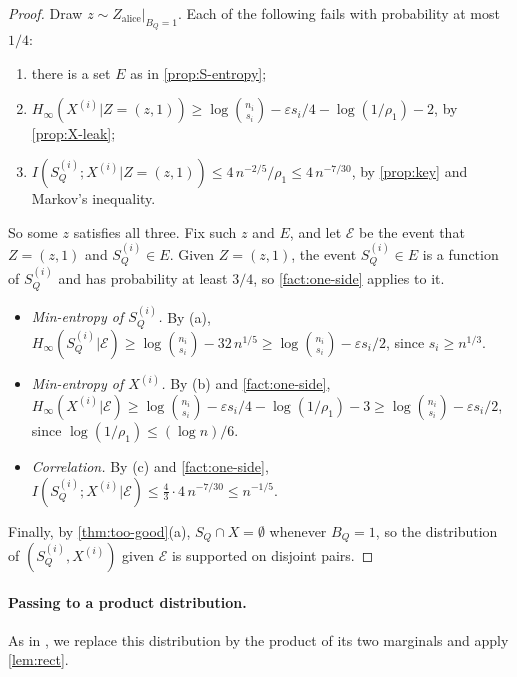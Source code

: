 \documentclass[11pt]{article}
\theoremstyle{plain}
\theoremstyle{definition}
\theoremstyle{remark}
\newcommand{\eps}{\varepsilon}
\newcommand{\cE}{\mathcal{E}}
\newcommand{\Hmin}{H_\infty}
\begin{document}
\begin{proof}
Draw $z \sim Z_{\mathrm{alice}}|_{B_Q=1}$. Each of the following fails with probability at most $1/4$:
\begin{enumerate}[label=(\alph*)]
  \item there is a set $E$ as in \cref{prop:S-entropy};
  \item $\Hmin(X^{(i)} | Z = (z, 1)) \ge \log\binom{n_i}{s_i} - \eps s_i/4 - \log(1/\rho_1) - 2$, by \cref{prop:X-leak};
  \item $I(S_Q^{(i)}; X^{(i)} | Z = (z, 1)) \le 4\, n^{-2/5}/\rho_1 \le 4\, n^{-7/30}$, by \cref{prop:key} and Markov's inequality.
\end{enumerate}
So some $z$ satisfies all three. Fix such $z$ and $E$, and let $\cE$ be the event that $Z = (z, 1)$ and $S_Q^{(i)} \in E$. Given $Z = (z, 1)$, the event $S_Q^{(i)} \in E$ is a function of $S_Q^{(i)}$ and has probability at least $3/4$, so \cref{fact:one-side} applies to it.
\begin{itemize}
  \item \emph{Min-entropy of $S_Q^{(i)}$.} By (a), $\Hmin(S_Q^{(i)} | \cE) \ge \log\binom{n_i}{s_i} - 32\, n^{1/5} \ge \log\binom{n_i}{s_i} - \eps s_i/2$, since $s_i \ge n^{1/3}$.
  \item \emph{Min-entropy of $X^{(i)}$.} By (b) and \cref{fact:one-side}, $\Hmin(X^{(i)} | \cE) \ge \log\binom{n_i}{s_i} - \eps s_i/4 - \log(1/\rho_1) - 3 \ge \log\binom{n_i}{s_i} - \eps s_i/2$, since $\log(1/\rho_1) \le (\log n)/6$.
  \item \emph{Correlation.} By (c) and \cref{fact:one-side}, $I(S_Q^{(i)}; X^{(i)} | \cE) \le \frac43 \cdot 4\, n^{-7/30} \le n^{-1/5}$.
\end{itemize}
Finally, by \cref{thm:too-good}(a), $S_Q \cap X = \emptyset$ whenever $B_Q = 1$, so the distribution of $(S_Q^{(i)}, X^{(i)})$ given $\cE$ is supported on disjoint pairs.
\end{proof}

\paragraph{Passing to a product distribution.}\label{sec:step3}
As in \cite{ko_omega_2026}, we replace this distribution by the product of its two marginals and apply \cref{lem:rect}.
\end{document}
